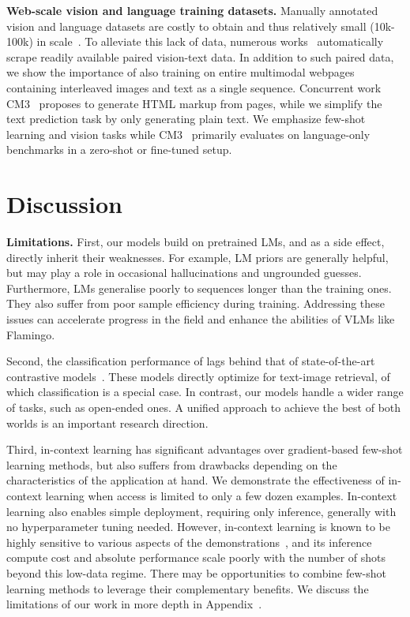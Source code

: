 \textbf{Web-scale vision and language training datasets.}
Manually annotated vision and language datasets are costly to obtain and thus relatively small (10k-100k) in scale~\citep{young2014image,chen2015microsoft,antol2015vqa,marino2019ok,wang2019vatex,xiao2021next}.
To alleviate this lack of data, numerous works~\citep{align,sharma2018conceptual,changpinyo2021conceptual,thomee2016yfcc100m} automatically scrape readily available paired vision-text data.
In addition to such paired data, we show the importance of also training on entire multimodal webpages containing interleaved images and text as a single sequence.
Concurrent work CM3~\citep{aghajanyan2022cm3} proposes to generate HTML markup from pages, while we simplify the text prediction task by only generating plain text.
We emphasize few-shot learning and vision tasks while CM3~\citep{aghajanyan2022cm3} primarily evaluates on language-only benchmarks in a zero-shot or fine-tuned setup.


\section{Discussion}

\label{sec:discussion}

\noindent
\textbf{Limitations.} First, our models build on pretrained LMs, and as a side effect, directly inherit their weaknesses.
For example, LM priors are generally helpful, but may play a role in occasional hallucinations and ungrounded guesses.
Furthermore, LMs generalise poorly to sequences longer than the training ones.
They also suffer from poor sample efficiency during training.
Addressing these issues can accelerate progress in the field and enhance the abilities of VLMs like Flamingo.

Second, the classification performance of \method{} lags behind that of state-of-the-art contrastive models~\citep{clip,pham2021combined}.
These models directly optimize for text-image retrieval, of which classification is a special case.
In contrast, our models handle a wider range of tasks, such as open-ended ones.
A unified approach to achieve the best of both worlds is an important research direction.

Third, in-context learning has significant advantages over gradient-based few-shot learning methods, but also suffers from drawbacks depending on the characteristics of the application at hand.
We demonstrate the effectiveness of in-context learning when access is limited to only a few dozen examples.
In-context learning also enables simple deployment, requiring only inference,
generally with no hyperparameter tuning needed.
However, in-context learning is known to be highly sensitive to various aspects of the demonstrations~\citep{zhao2021calibrate,truefewshot},
and its inference compute cost and absolute performance scale poorly with the number of shots beyond this low-data regime.
There may be opportunities to combine few-shot learning methods to leverage their complementary benefits.
We discuss the limitations of our work in more depth in Appendix~.


